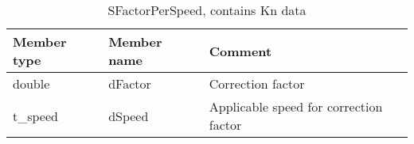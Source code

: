 \documentclass{template/openetcs_article}
\begin{document}
\begin{longtable}{|l|l|l|}
	\caption{SFactorPerSpeed, contains Kn data} \\ 
	\hline
		\begin{minipage}[t]{0.20\linewidth} \textbf{Member type}	\end{minipage}
	&	\begin{minipage}[t]{0.20\linewidth} \textbf{Member name}	\end{minipage} 
	&	\begin{minipage}[t]{0.65\linewidth} \textbf{Comment} \end{minipage} \\
	\hline
		\begin{minipage}[t]{0.20\linewidth} double \end{minipage} 
	&	\begin{minipage}[t]{0.20\linewidth} dFactor \end{minipage} 
	&	\begin{minipage}[t]{0.65\linewidth} Correction factor \end{minipage}\\
	\hline
		\begin{minipage}[t]{0.20\linewidth} t\_speed \end{minipage} 
	&	\begin{minipage}[t]{0.20\linewidth} dSpeed \end{minipage} 
	&	\begin{minipage}[t]{0.65\linewidth} Applicable speed for correction factor \end{minipage}\\
	\hline
\end{longtable}

\end{document}
